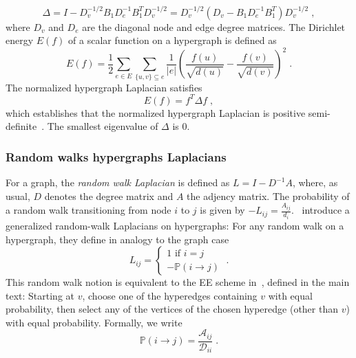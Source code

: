\begin{equation} \label{normalizedLaplacian} 
\Delta = I - D_v^{-1/2}B_1D_e^{-1}B_1^TD_v^{-1/2} = D_v^{-1/2}(D_v -B_1D_e^{-1}B_1^T)D_v^{-1/2} \; ,
\end{equation}
where $D_v$ and $D_e$ are the diagonal node and edge degree matrices. The Dirichlet energy $E(f)$ of a scalar function on a hypergraph is defined as
\begin{equation} 
E(f) = \frac{1}{2}\sum_{e\in E} \sum_{\{u,v\}\subseteq e} \frac{1}{|e|} \left( \frac{f(u)}{\sqrt{d(u)}} - \frac{f(v)}{\sqrt{d(v)}} \right)^2 \; .
\end{equation}
The normalized hypergraph Laplacian satisfies
\begin{equation} 
E(f) = f^T\Delta f \; ,
\end{equation}
which establishes that the normalized hypergraph Laplacian is positive semi-definite~\citep{zhou2006learning}. The smallest eigenvalue of $\Delta$ is $0$.



\subsubsection{Random walks hypergraphs Laplacians}

For a graph, the \textit{random walk Laplacian} is defined as $L=I-D^{-1}A$, where, as usual, $D$ denotes the degree matrix and $A$ the adjency matrix. The probability of a random walk transitioning from node $i$ to $j$ is given by $-L_{ij}=\frac{A_{ij}}{d_i}$. \citet{mulas2022random}~introduce a generalized random-walk Laplacians on hypergraphs: For any random walk on a hypergraph, they define in analogy to the graph case
\begin{equation} 
L_{ij} = \begin{cases} 1 \text{ if } i=j \\
 - \mathbb{P}(i \rightarrow j)\end{cases} \; .
 \end{equation}
This random walk notion is equivalent to the EE scheme in~\citet{coupette2022ollivier}, defined in the main text: Starting at $v$, choose one of the hyperedges containing $v$ with equal probability, then select any of the vertices of the chosen hyperedge (other than $v$) with equal probability. Formally, we write \begin{equation} \label{laplacian} \mathbb{P}(i \rightarrow j) = \frac{\mathcal{A}_{ij}}{\mathcal{D}_{ii}} \; . \end{equation}

